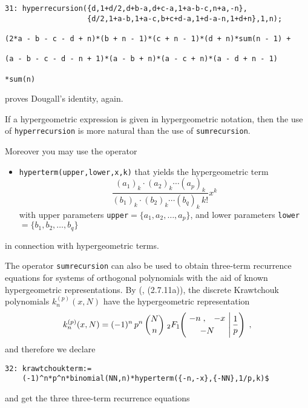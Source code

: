 {\small
\begin{verbatim}
31: hyperrecursion({d,1+d/2,d+b-a,d+c-a,1+a-b-c,n+a,-n},
                   {d/2,1+a-b,1+a-c,b+c+d-a,1+d-a-n,1+d+n},1,n);

(2*a - b - c - d + n)*(b + n - 1)*(c + n - 1)*(d + n)*sum(n - 1) + 

(a - b - c - d - n + 1)*(a - b + n)*(a - c + n)*(a - d + n - 1)

*sum(n)
\end{verbatim}
}\noindent
proves Dougall's identity, again.

If a hypergeometric expression is given in hypergeometric notation, then
the use of {\tt hyperrecursion} is more natural than the use of
{\tt sumrecursion}.

Moreover you may use the \REDUCE{} operator
\begin{itemize}
\item
{\tt hyperterm(upper,lower,x,k)} that yields the hypergeometric term
\[
\frac
{(a_{1})_{k}\cdot(a_{2})_{k}\cdots(a_{p})_{k}}
{(b_{1})_{k}\cdot(b_{2})_{k}\cdots(b_{q})_{k}\,k!}x^{k}
\]
with upper parameters {\tt upper}$=\{a_{1}, a_{2}, \ldots, a_{p}\}$,
and lower parameters {\tt lower}$=\{b_{1}, b_{2}, \ldots, b_{q}\}$
\end{itemize}
in connection with hypergeometric terms.

The operator {\tt sumrecursion} can also be used to 
obtain three-term recurrence equations for systems of orthogonal polynomials
with the aid of known hypergeometric representations. By
(\cite{NSU}, (2.7.11a)), the discrete Krawtchouk polynomials $k_n^{(p)}(x,N)$
have the hypergeometric representation
\[
k_n^{(p)}(x,N)=
(-1)^n\,p^n\,\binom{N}{n}\;
_2 F_1\left.
\!\!
\left(
\!\!\!\!
\begin{array}{c}
\multicolumn{1}{c}{\begin{array}{cc} -n\;, & -x \end{array}}\\[1mm]
\multicolumn{1}{c}{ -N}
            \end{array}
\!\!\!\!
\right| \frac{1}{p}\right)
\;,
\]
and therefore we declare

{\small
\begin{verbatim}
32: krawtchoukterm:=
    (-1)^n*p^n*binomial(NN,n)*hyperterm({-n,-x},{-NN},1/p,k)$
\end{verbatim}
}\noindent
and get the three three-term recurrence equations

